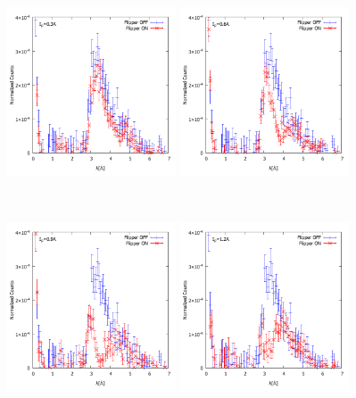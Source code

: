 \begin{figure}[h]
\begin{minipage}{0.33\hsize}
\end{minipage}
\begin{minipage}{0.33\hsize}
\includegraphics[width=5cm]{discussion/NC-BG/NormalizedCounts_b_3A.pdf}
\end{minipage}
\begin{minipage}{0.33\hsize}
\includegraphics[width=5cm]{discussion/NC-BG/NormalizedCounts_b_6A.pdf}
\end{minipage}\\
\begin{minipage}{0.33\hsize}
\includegraphics[width=5cm]{discussion/NC-BG/NormalizedCounts_b_9A.pdf}
\end{minipage}
\begin{minipage}{0.33\hsize}
\includegraphics[width=5cm]{discussion/NC-BG/NormalizedCounts_b_12A.pdf}

\end{minipage}
\end{figure}
